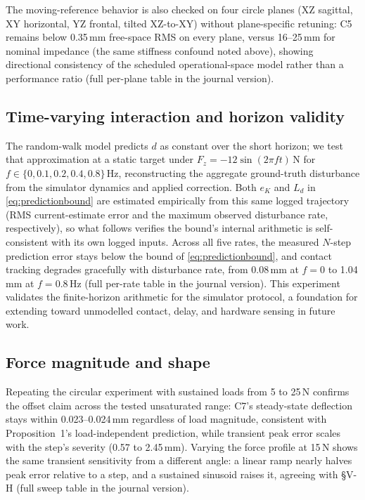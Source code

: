 \documentclass[conference]{IEEEtran}
\begin{document}
The moving-reference behavior is also checked on four circle planes (XZ
sagittal, XY horizontal, YZ frontal, tilted XZ-to-XY) without
plane-specific retuning: C5 remains below 0.35\,mm free-space RMS on every
plane, versus 16--25\,mm for nominal impedance (the same stiffness
confound noted above), showing directional consistency of the scheduled
operational-space model rather than a performance ratio (full per-plane
table in the journal version).

\subsection{Time-varying interaction and horizon validity}

The random-walk model predicts $d$ as constant over the short horizon; we
test that approximation at a static target under $F_z=-12\sin(2\pi ft)$\,N
for $f\in\{0,0.1,0.2,0.4,0.8\}$\,Hz, reconstructing the aggregate ground-truth
disturbance from the simulator dynamics and applied correction. Both
$e_K$ and $L_d$ in \eqref{eq:predictionbound} are estimated empirically from
this same logged trajectory (RMS current-estimate error and the maximum
observed disturbance rate, respectively), so what follows verifies the
bound's internal arithmetic is self-consistent with its own logged
inputs. Across all
five rates, the measured $N$-step prediction error stays below the bound of
\eqref{eq:predictionbound}, and contact tracking degrades gracefully with
disturbance rate, from 0.08\,mm at $f=0$ to 1.04\,mm at $f=0.8$\,Hz (full
per-rate table in the journal version). This experiment validates the
finite-horizon arithmetic for the simulator protocol, a foundation for
extending toward unmodelled contact, delay, and hardware sensing in
future work.

\subsection{Force magnitude and shape}

Repeating the circular experiment with sustained loads from 5 to 25\,N
confirms the offset claim across the tested unsaturated range: C7's
steady-state deflection stays within 0.023--0.024\,mm regardless of load
magnitude, consistent with Proposition~1's load-independent prediction,
while transient peak error scales with the step's severity (0.57 to
2.45\,mm). Varying the force profile at 15\,N shows the same transient
sensitivity from a different angle: a linear ramp nearly halves peak
error relative to a step, and a sustained sinusoid raises it, agreeing
with \S V-H (full sweep table in the journal version).
\end{document}
